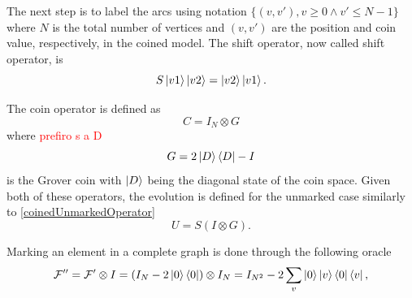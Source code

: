 \documentclass[../../dissertation.tex]{subfiles}
\begin{document}
%                
The next step is to label the arcs using notation $\{(v,v'), v \geqslant 0 \land v' \leqslant N-1\}$ 
where $N$ is the total number of vertices and $(v,v')$ are the position and coin value, respectively, in the coined model. 
The shift operator, now called  shift operator, is
\begin{equation}
	S\ket{v1}\ket{v2} = \ket{v2}\ket{v1}.
\end{equation}\par
The coin operator is defined as
\begin{equation}
	C = I_N \otimes G
\end{equation}
where \textcolor{red}{prefiro s a D}
\begin{equation}
	G = 2\ket{D}\bra{D} - I
\end{equation}
is the Grover coin with $\ket{D}$ being the diagonal state of the coin space. Given both of these operators, the evolution is defined for the unmarked case similarly to \ref{coinedUnmarkedOperator}
\begin{equation}
	U = S(I \otimes G).
\end{equation}\par
Marking an element in a complete graph is done through the following oracle
\begin{equation}
	\mathcal{F''} =\mathcal{F'}\otimes I = (I_N - 2\ket{0}\bra{0})\otimes I_N = I_{N^2} - 2 \sum_v \ket{0}\ket{v}\bra{0}\bra{v} ,
\end{equation}
\end{document}
